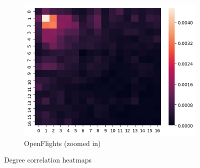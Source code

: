 \documentclass[../document.tex]{subfiles}
\begin{document}
\begin{figure}[h]
\begin{subfigure}[b]{0.3\textwidth}
    \end{subfigure}
    ~
    \begin{subfigure}[b]{0.3\textwidth}
        \includegraphics[width=\textwidth]{img/heatmap_2}
        \caption*{OpenFlights (zoomed in)}
    \end{subfigure}
    \caption{Degree correlation heatmaps}
\end{figure}
\end{document}

